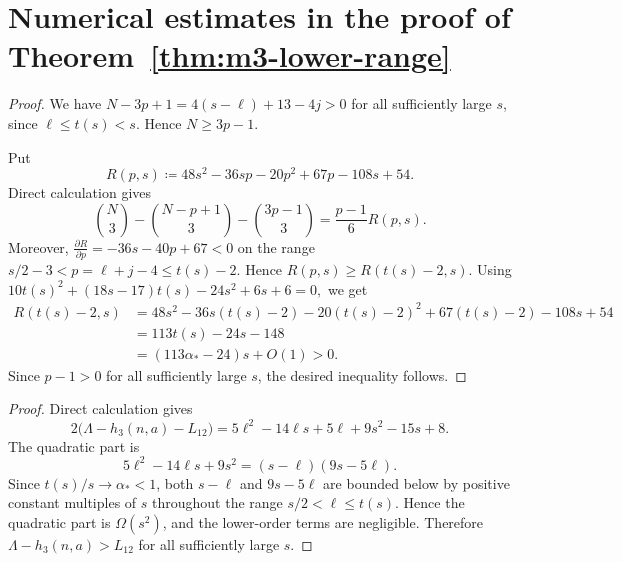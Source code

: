 \documentclass[10pt,a4paper]{article}
\numberwithin{equation}{section}
\newtheorem{lemma}[lemma]{Lemma}
\theoremstyle{definition}
\begin{document}
\appendix

\section{Numerical estimates in the proof of Theorem~\ref{thm:m3-lower-range}}
\label{app:m3-numerics}


\begin{proof}
    We have
    \(N-3p+1=4(s-\ell)+13-4j>0\)
    for all sufficiently large \(s\), since \(\ell\le t(s)<s\).
    Hence \(N\ge3p-1\).

    Put
    \[
        R(p,s)
        \coloneqq
        48s^2-36sp-20p^2+67p-108s+54.
    \]
    Direct calculation gives
    \[
        \binom N3-\binom{N-p+1}3-\binom{3p-1}3
        =
        \frac{p-1}{6}R(p,s).
    \]
    Moreover,
    \(\frac{\partial R}{\partial p}=-36s-40p+67<0\)
    on the range \(s/2-3<p=\ell+j-4\le t(s)-2\).  Hence
    \(R(p,s)\ge R(t(s)-2,s).\)
    Using
    \(10t(s)^2+(18s-17)t(s)-24s^2+6s+6=0,\)
    we get
    \[
        \begin{aligned}
            R(t(s)-2,s)
             & =
            48s^2-36s(t(s)-2)-20(t(s)-2)^2+67(t(s)-2)-108s+54 \\
             & =113t(s)-24s-148                               \\
             & =(113\alpha_*-24)s+O(1)>0.
        \end{aligned}
    \]
    Since \(p-1>0\) for all sufficiently large \(s\), the desired inequality
    follows.
\end{proof}


\begin{proof}
    Direct calculation gives
    \[
        2\bigl(\Lambda-h_3(n,a)-L_{12}\bigr)
        =
        5\ell^2-14\ell s+5\ell+9s^2-15s+8.
    \]
    The quadratic part is
    \[
        5\ell^2-14\ell s+9s^2
        =
        (s-\ell)(9s-5\ell).
    \]
    Since \(t(s)/s\to\alpha_*<1\), both \(s-\ell\) and \(9s-5\ell\)
    are bounded below by positive constant multiples of \(s\) throughout
    the range \(s/2<\ell\le t(s)\).  Hence the quadratic part is
    \(\Omega(s^2)\), and the lower-order terms are negligible.  Therefore
    \(\Lambda-h_3(n,a)>L_{12}\) for all sufficiently large \(s\).
\end{proof}
\end{document}
